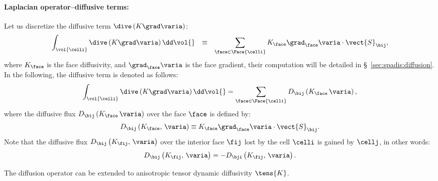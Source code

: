 \paragraph{Laplacian operator--diffusive terms:}
Let us discretize the diffusive term $\dive \left(  K \grad \varia  \right) $:
%
 \begin{equation}\label{eq:spadis:diffusion_def}
 \begin{array}{r c l}
\displaystyle \int_{\vol{\celli}} \dive \left( K \grad \varia\right) \dd \vol{} &\equiv &
\displaystyle \sum_{\face \in \Face{\celli}} K_\face \grad_\face \varia \cdot \vect{S}_{\bij},
 \end{array}
 \end{equation}
  where $K_\face$ is the face diffusivity, and $\grad_\face \varia$ is the face gradient, their computation will be detailed in \S~\ref{sec:spadis:diffusion}. In the following, the diffusive term is denoted as follows:
\begin{equation}\label{eq:spadis:diffusion_notation}
\int_{\vol{\celli}} \dive \left( K \grad \varia\right) \dd \vol{}
 =
\sum_{\face \in \Face{\celli}} D_{\bij} \left(  K_\face \,  \varia \right),
\end{equation}
 where the diffusive flux $D_{\bij} \left(  K_\face \,  \varia \right)$ over the face $\face$ is defined by:
 \begin{equation}\label{eq:spadis:diffusion_flux}
D_{\bij} \left( K_\face , \, \varia\right) \equiv   K_\face \grad_\face \varia \cdot \vect{S}_{\bij}.
 \end{equation}
 Note that the diffusive flux $D_{\bij} \left( K_\fij , \, \varia\right) $ over the interior face $\fij$ lost by the cell $\celli$
 is gained by $\cellj$, in other words:
 \begin{equation}\label{eq:spadis:diffusion_flux_symmetry}
D_{\bij} \left( K_\fij , \, \varia\right) = - D_{\bji} \left( K_\fij , \, \varia\right) .
 \end{equation}

 \begin{remark}
The diffusion operator can be extended to anisotropic tensor dynamic diffusivity $\tens{K}$.
 \end{remark}

